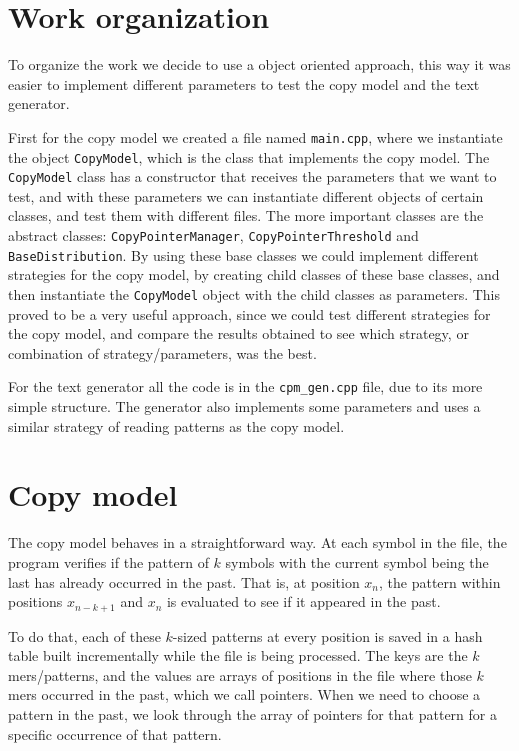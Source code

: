 \documentclass{article}
\begin{document}
\section{Work organization}
\label{sec:work-organization}

To organize the work we decide to use a object oriented approach, this way it was easier to implement different parameters to test the copy model and the text generator.

First for the copy model we created a file named \verb|main.cpp|, where we instantiate the object \verb|CopyModel|, which is the class that implements the copy model.
The \verb|CopyModel| class has a constructor that receives the parameters that we want to test, and with these parameters we can instantiate different objects of certain classes, and test them with different files.
The more important classes are the abstract classes: \verb|CopyPointerManager|, \verb|CopyPointerThreshold| and \verb|BaseDistribution|. By using these base classes we could implement different strategies for the copy model, by creating child classes of these base classes, and then instantiate the \verb|CopyModel| object with the child classes as parameters.
This proved to be a very useful approach, since we could test different strategies for the copy model, and compare the results obtained to see which strategy, or combination of strategy/parameters, was the best.

For the text generator all the code is in the \verb|cpm_gen.cpp| file, due to its more simple structure. The generator also implements some parameters and uses a similar strategy of reading patterns as the copy model.

\section{Copy model}
\label{sec:copy-model}

The copy model behaves in a straightforward way.
At each symbol in the file, the program verifies if the pattern of $k$ symbols with the current symbol being the last has already occurred in the past.
That is, at position $x_n$, the pattern within positions $x_{n-k+1}$ and $x_n$ is evaluated to see if it appeared in the past.

To do that, each of these $k$-sized patterns at every position is saved in a hash table built incrementally while the file is being processed.
The keys are the $k$mers/patterns, and the values are arrays of positions in the file where those $k$mers occurred in the past, which we call pointers.
When we need to choose a pattern in the past, we look through the array of pointers for that pattern for a specific occurrence of that pattern.
\end{document}
